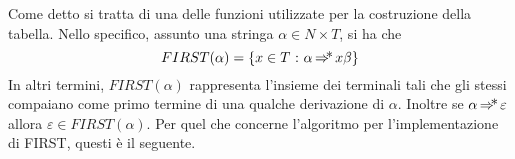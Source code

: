 \documentclass{subfiles}
\begin{document}
Come detto si tratta di una delle funzioni utilizzate per la costruzione della tabella.
Nello specifico, assunto una stringa $\alpha \in N \times T$, si ha che
$$
    FIRST(\alpha) = \Set{x \in T}[\alpha \Derivation x\beta]
$$
In altri termini, $FIRST(\alpha)$ rappresenta l'insieme dei terminali tali che gli stessi compaiano come primo termine di una qualche derivazione di $\alpha$.
Inoltre se $\alpha \operatorname{\Rightarrow\hspace{-5pt}*} \varepsilon$ allora $\varepsilon \in FIRST(\alpha)$.
Per quel che concerne l'algoritmo per l'implementazione di FIRST, questi è il seguente.

\end{document}

